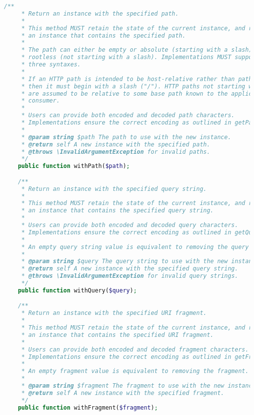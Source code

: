 \begin{lstlisting}[language=PHP]
    /**
     * Return an instance with the specified path.
     *
     * This method MUST retain the state of the current instance, and return
     * an instance that contains the specified path.
     *
     * The path can either be empty or absolute (starting with a slash) or
     * rootless (not starting with a slash). Implementations MUST support all
     * three syntaxes.
     *
     * If an HTTP path is intended to be host-relative rather than path-relative
     * then it must begin with a slash ("/"). HTTP paths not starting with a slash
     * are assumed to be relative to some base path known to the application or
     * consumer.
     *
     * Users can provide both encoded and decoded path characters.
     * Implementations ensure the correct encoding as outlined in getPath().
     *
     * @param string $path The path to use with the new instance.
     * @return self A new instance with the specified path.
     * @throws \InvalidArgumentException for invalid paths.
     */
    public function withPath($path);

    /**
     * Return an instance with the specified query string.
     *
     * This method MUST retain the state of the current instance, and return
     * an instance that contains the specified query string.
     *
     * Users can provide both encoded and decoded query characters.
     * Implementations ensure the correct encoding as outlined in getQuery().
     *
     * An empty query string value is equivalent to removing the query string.
     *
     * @param string $query The query string to use with the new instance.
     * @return self A new instance with the specified query string.
     * @throws \InvalidArgumentException for invalid query strings.
     */
    public function withQuery($query);

    /**
     * Return an instance with the specified URI fragment.
     *
     * This method MUST retain the state of the current instance, and return
     * an instance that contains the specified URI fragment.
     *
     * Users can provide both encoded and decoded fragment characters.
     * Implementations ensure the correct encoding as outlined in getFragment().
     *
     * An empty fragment value is equivalent to removing the fragment.
     *
     * @param string $fragment The fragment to use with the new instance.
     * @return self A new instance with the specified fragment.
     */
    public function withFragment($fragment);


\end{lstlisting}
